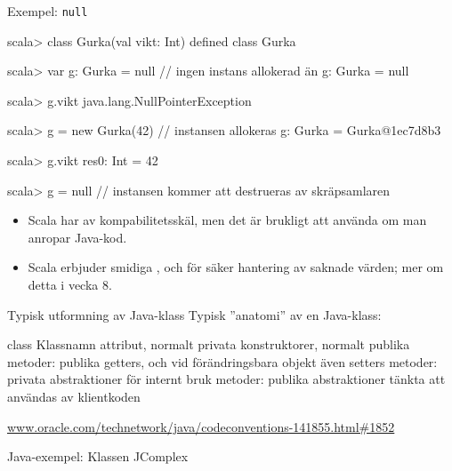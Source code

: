 \begin{Slide}{Exempel: \texttt{null}}
\begin{REPL}
scala> class Gurka(val vikt: Int)
defined class Gurka

scala> var g: Gurka = null        // ingen instans allokerad än
g: Gurka = null

scala> g.vikt
java.lang.NullPointerException

scala> g = new Gurka(42)          // instansen allokeras
g: Gurka = Gurka@1ec7d8b3

scala> g.vikt
res0: Int = 42

scala> g = null         // instansen kommer att destrueras av skräpsamlaren
\end{REPL}

\begin{itemize} \SlideFontSmall
\item Scala har  av kompabilitetsskäl, men det är brukligt att  använda  om man anropar Java-kod.

\item Scala erbjuder smidiga ,  och  för säker hantering av saknade värden; mer om detta i vecka 8.



\end{itemize}
\end{Slide}







\begin{Slide}{Typisk utformning av Java-klass}
Typisk ''anatomi'' av en Java-klass:
\begin{Code}[language=Java]
class Klassnamn {
    attribut, normalt privata
    konstruktorer, normalt publika
    metoder: publika getters, och vid förändringsbara objekt även setters
    metoder: privata abstraktioner för internt bruk
    metoder: publika abstraktioner tänkta att användas av klientkoden 
}
\end{Code}
\href{http://www.oracle.com/technetwork/java/codeconventions-141855.html#1852}{www.oracle.com/technetwork/java/codeconventions-141855.html\#1852}
\end{Slide}




\begin{Slide}{Java-exempel: Klassen JComplex}\SlideFontSmall
{}
\end{Slide}




